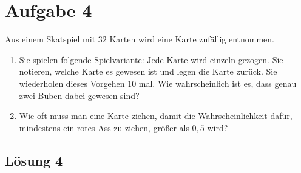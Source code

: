 \documentclass[main.tex]{subfiles}
\begin{document}
\section{Aufgabe 4}
Aus einem Skatspiel mit $32$ Karten wird eine Karte zufällig entnommen. 
\begin{enumerate}
\item Sie spielen folgende Spielvariante: Jede Karte wird einzeln gezogen. Sie notieren, welche Karte es gewesen ist und legen die Karte zurück. Sie wiederholen dieses Vorgehen $10$ mal. Wie wahrscheinlich ist es, dass genau zwei Buben dabei gewesen sind?
\item Wie oft muss man eine Karte ziehen, damit die Wahrscheinlichkeit dafür, mindestens ein rotes Ass zu ziehen, größer als $0,5$ wird?
\end{enumerate}

\subsection{Lösung 4}
\end{document}
